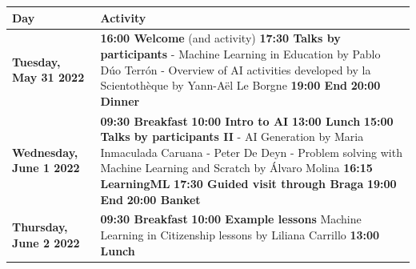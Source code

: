 \documentclass[11pt]{article}
\begin{document}
\begin{table}
    \renewcommand{\arraystretch}{1.4}
     \begin{center}
      \begin{tabular}{m{6cm} m{8cm}} %
        \hline
        \rowcolor{gray!35}\centering\arraybackslash\textbf{Day} & \centering\arraybackslash\textbf{Activity} \\
        \hline%
        
        \centering\textbf{Tuesday, May 31 2022} &  \textbf{16:00 Welcome} (and activity) \newline
        \textbf{17:30 Talks by participants} \newline
        - Machine Learning in Education by Pablo Dúo Terrón \newline
        - Overview of AI activities developed by la Scientothèque by Yann-Aël Le Borgne 
        \newline
        \textbf{19:00 End} \newline
        \textbf{20:00 Dinner}
        \\ %
        \rowcolor{gray!15}
        \centering\textbf{Wednesday, June 1 2022} & \textbf{09:30 Breakfast} \newline \textbf{10:00 Intro to AI} \newline \textbf{13:00 Lunch} \newline 
        \textbf{15:00 Talks by participants II} \newline
        - AI Generation by Maria Inmaculada Caruana\newline
        - Peter De Deyn \newline
        - Problem solving with Machine Learning and Scratch by Álvaro Molina
        \newline
        \textbf{16:15 LearningML} \newline
        \textbf{17:30 Guided visit through Braga} \newline
        \textbf{19:00 End} \newline
        \textbf{20:00 Banket}
        \\ 
        \centering\textbf{Thursday, June 2 2022} & \textbf{09:30 Breakfast} \newline \textbf{10:00 Example lessons} Machine Learning in Citizenship lessons by Liliana Carrillo 
        \newline \textbf{13:00 Lunch} \newline

\end{tabular}
\end{center}
\end{table}
\end{document}
